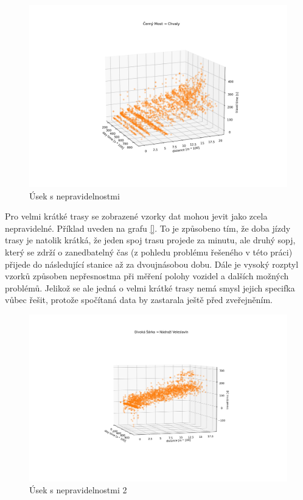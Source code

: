 \begin{figure}
	\centering
  \includegraphics[width=\linewidth]{../img/cerny_most_chvaly.png}
  \caption{Úsek s nepravidelnostmi}
  \label{fig:cerny_most_chvaly}
\end{figure}

Pro velmi krátké trasy se zobrazené vzorky dat mohou jevit jako zcela nepravidelné. Příklad uveden na grafu \ref{}. To je způsobeno tím, že doba jízdy trasy je natolik krátká, že jeden spoj trasu projede za minutu, ale druhý sopj, který se zdrží o zanedbatelný čas (z pohledu problému řešeného v této práci) přijede do následující stanice až za dvoujnásobou dobu. Dále je vysoký rozptyl vzorků způsoben nepřesnostma při měření polohy vozidel a dalších možných problémů. Jelikož se ale jedná o velmi krátké trasy nemá smysl jejich specifka vůbec řešit, protože spočítaná data by zastarala ještě před zveřejněním.

\begin{figure}
	\centering
  \includegraphics[width=\linewidth]{../img/divoka_sarka_veleslavin.png}
  \caption{Úsek s nepravidelnostmi 2}
  \label{fig:divoka_sarka_veleslavin}
\end{figure}

